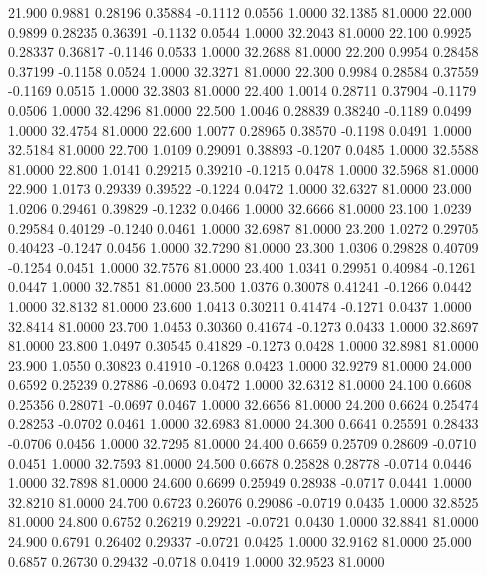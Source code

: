   21.900   0.9881   0.28196   0.35884  -0.1112   0.0556   1.0000  32.1385  81.0000
  22.000   0.9899   0.28235   0.36391  -0.1132   0.0544   1.0000  32.2043  81.0000
  22.100   0.9925   0.28337   0.36817  -0.1146   0.0533   1.0000  32.2688  81.0000
  22.200   0.9954   0.28458   0.37199  -0.1158   0.0524   1.0000  32.3271  81.0000
  22.300   0.9984   0.28584   0.37559  -0.1169   0.0515   1.0000  32.3803  81.0000
  22.400   1.0014   0.28711   0.37904  -0.1179   0.0506   1.0000  32.4296  81.0000
  22.500   1.0046   0.28839   0.38240  -0.1189   0.0499   1.0000  32.4754  81.0000
  22.600   1.0077   0.28965   0.38570  -0.1198   0.0491   1.0000  32.5184  81.0000
  22.700   1.0109   0.29091   0.38893  -0.1207   0.0485   1.0000  32.5588  81.0000
  22.800   1.0141   0.29215   0.39210  -0.1215   0.0478   1.0000  32.5968  81.0000
  22.900   1.0173   0.29339   0.39522  -0.1224   0.0472   1.0000  32.6327  81.0000
  23.000   1.0206   0.29461   0.39829  -0.1232   0.0466   1.0000  32.6666  81.0000
  23.100   1.0239   0.29584   0.40129  -0.1240   0.0461   1.0000  32.6987  81.0000
  23.200   1.0272   0.29705   0.40423  -0.1247   0.0456   1.0000  32.7290  81.0000
  23.300   1.0306   0.29828   0.40709  -0.1254   0.0451   1.0000  32.7576  81.0000
  23.400   1.0341   0.29951   0.40984  -0.1261   0.0447   1.0000  32.7851  81.0000
  23.500   1.0376   0.30078   0.41241  -0.1266   0.0442   1.0000  32.8132  81.0000
  23.600   1.0413   0.30211   0.41474  -0.1271   0.0437   1.0000  32.8414  81.0000
  23.700   1.0453   0.30360   0.41674  -0.1273   0.0433   1.0000  32.8697  81.0000
  23.800   1.0497   0.30545   0.41829  -0.1273   0.0428   1.0000  32.8981  81.0000
  23.900   1.0550   0.30823   0.41910  -0.1268   0.0423   1.0000  32.9279  81.0000
  24.000   0.6592   0.25239   0.27886  -0.0693   0.0472   1.0000  32.6312  81.0000
  24.100   0.6608   0.25356   0.28071  -0.0697   0.0467   1.0000  32.6656  81.0000
  24.200   0.6624   0.25474   0.28253  -0.0702   0.0461   1.0000  32.6983  81.0000
  24.300   0.6641   0.25591   0.28433  -0.0706   0.0456   1.0000  32.7295  81.0000
  24.400   0.6659   0.25709   0.28609  -0.0710   0.0451   1.0000  32.7593  81.0000
  24.500   0.6678   0.25828   0.28778  -0.0714   0.0446   1.0000  32.7898  81.0000
  24.600   0.6699   0.25949   0.28938  -0.0717   0.0441   1.0000  32.8210  81.0000
  24.700   0.6723   0.26076   0.29086  -0.0719   0.0435   1.0000  32.8525  81.0000
  24.800   0.6752   0.26219   0.29221  -0.0721   0.0430   1.0000  32.8841  81.0000
  24.900   0.6791   0.26402   0.29337  -0.0721   0.0425   1.0000  32.9162  81.0000
  25.000   0.6857   0.26730   0.29432  -0.0718   0.0419   1.0000  32.9523  81.0000

